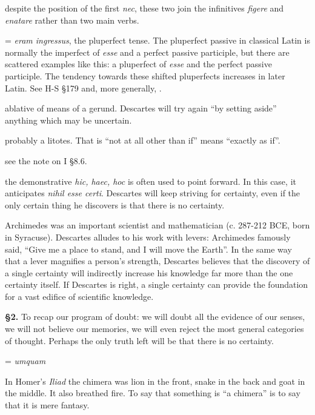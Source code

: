  despite the position of the first \textit{nec}, these two join the infinitives \textit{figere} and \textit{enatare} rather than two main verbs.

 = \textit{eram ingressus}, the pluperfect tense. The pluperfect passive in classical Latin is normally the imperfect of \textit{esse} and a perfect passive participle, but there are scattered examples like this: a pluperfect of \textit{esse} and the perfect passive participle. The tendency towards these shifted pluperfects increases in later Latin. See H-S §179 and, more generally, \cite[§298]{väänänen1981}.

 ablative of means of a gerund. Descartes will try again ``by setting aside'' anything which may be uncertain.

 probably a litotes. That is ``not at all other than if'' means ``exactly as if''.

 see the note on I §8.6.

 the demonstrative \textit{hic, haec, hoc} is often used to point forward. In this case, it anticipates \textit{nihil esse certi}. Descartes will keep striving for certainty, even if the only certain thing he discovers is that there is no certainty.

 Archimedes was an important scientist and mathematician (c. 287-212 BCE, born in Syracuse). Descartes alludes to his work with levers: Archimedes famously said, ``Give me a place to stand, and I will move the Earth''. In the same way that a lever magnifies a person's strength, Descartes believes that the discovery of a single certainty will indirectly increase his knowledge far more than the one certainty itself. If Descartes is right, a single certainty can provide the foundation for a vast edifice of scientific knowledge.

\textbf{§2.} To recap our program of doubt: we will doubt all the evidence of our senses, we will not believe our memories, we will even reject the most general categories of thought. Perhaps the only truth left will be that there is no certainty.

 = \textit{umquam}

 In Homer's \textit{Iliad} the chimera was lion in the front, snake in the back and goat in the middle. It also breathed fire. To say that something is ``a chimera'' is to say that it is mere fantasy.

